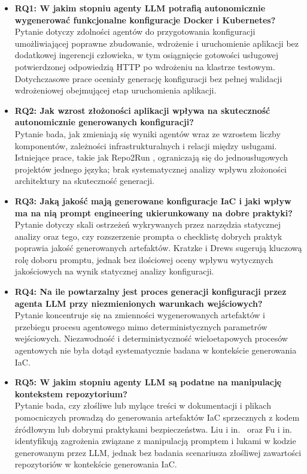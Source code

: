 \begin{itemize}
    \item \textbf{RQ1: W jakim stopniu agenty LLM potrafią autonomicznie wygenerować funkcjonalne konfiguracje Docker i Kubernetes?} \\
    Pytanie dotyczy zdolności agentów do przygotowania konfiguracji umożliwiającej poprawne zbudowanie, wdrożenie i uruchomienie aplikacji bez dodatkowej ingerencji człowieka, w tym osiągnięcie gotowości usługowej potwierdzonej odpowiedzią HTTP po wdrożeniu na klastrze testowym. Dotychczasowe prace \cite{xu_cloudeval-yaml_2023, kratzke_dont_2024} oceniały generację konfiguracji bez pełnej walidacji wdrożeniowej obejmującej etap uruchomienia aplikacji.

    \item \textbf{RQ2: Jak wzrost złożoności aplikacji wpływa na skuteczność autonomicznie generowanych konfiguracji?} \\
    Pytanie bada, jak zmieniają się wyniki agentów wraz ze wzrostem liczby komponentów, zależności infrastrukturalnych i relacji między usługami. Istniejące prace, takie jak Repo2Run \cite{hu_llm-based_2025}, ograniczają się do jednousługowych projektów jednego języka; brak systematycznej analizy wpływu złożoności architektury na skuteczność generacji.

    \item \textbf{RQ3: Jaką jakość mają generowane konfiguracje IaC i jaki wpływ ma na nią prompt engineering ukierunkowany na dobre praktyki?} \\
    Pytanie dotyczy skali ostrzeżeń wykrywanych przez narzędzia statycznej analizy oraz tego, czy rozszerzenie prompta o checklistę dobrych praktyk poprawia jakość generowanych artefaktów. Kratzke i Drews \cite{kratzke_dont_2024} sugerują kluczową rolę doboru promptu, jednak bez ilościowej oceny wpływu wytycznych jakościowych na wynik statycznej analizy konfiguracji.

    \item \textbf{RQ4: Na ile powtarzalny jest proces generacji konfiguracji przez agenta LLM przy niezmienionych warunkach wejściowych?} \\
    Pytanie koncentruje się na zmienności wygenerowanych artefaktów i przebiegu procesu agentowego mimo deterministycznych parametrów wejściowych. Niezawodność i deterministyczność wieloetapowych procesów agentowych nie była dotąd systematycznie badana w kontekście generowania IaC.

    \item \textbf{RQ5: W jakim stopniu agenty LLM są podatne na manipulację kontekstem repozytorium?} \\
    Pytanie bada, czy złośliwe lub mylące treści w dokumentacji i plikach pomocniczych prowadzą do generowania artefaktów IaC sprzecznych z kodem źródłowym lub dobrymi praktykami bezpieczeństwa. Liu i in.\ \cite{liu_prompt_2024} oraz Fu i in.\ \cite{fu_security_2025} identyfikują zagrożenia związane z manipulacją promptem i lukami w kodzie generowanym przez LLM, jednak bez badania scenariusza złośliwej zawartości repozytoriów w kontekście generowania IaC.
\end{itemize}

